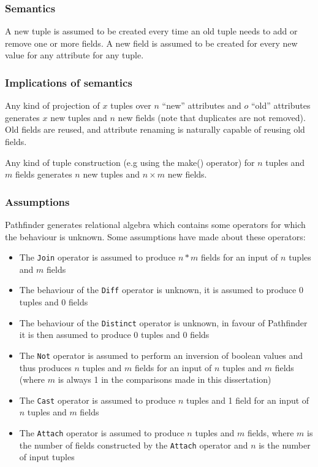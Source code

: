 \subsubsection{Semantics}
A new tuple is assumed to be created every time an old tuple needs to add or
remove one or more fields. A new field is assumed to be created for every new
value for any attribute for any tuple.

\subsubsection{Implications of semantics}
Any kind of projection of $x$ tuples over $n$ ``new'' attributes and $o$
``old'' attributes generates $x$ new tuples and $n$ new fields (note that
duplicates are not removed). Old fields are reused, and attribute renaming
is naturally capable of reusing old fields.

Any kind of tuple construction (e.g using the \textsf{make()} operator)
for $n$ tuples and $m$ fields generates $n$ new tuples and $n \times m$ new
fields.

\subsubsection{Assumptions}
\label{sect:method:complexity:assumptions}
Pathfinder generates relational algebra which contains some operators for which
the behaviour is unknown. Some assumptions have made about these operators:
\begin{itemize}
  \item The \texttt{Join} operator is assumed to produce $n*m$ fields for an
  input of $n$ tuples and $m$ fields
  \item The behaviour of the \texttt{Diff} operator is unknown, it is assumed
  to produce 0 tuples and 0 fields
  \item The behaviour of the \texttt{Distinct} operator is unknown, in favour
  of Pathfinder it is then assumed to produce 0 tuples and 0 fields
  \item The \texttt{Not} operator is assumed to perform an inversion of boolean
  values and thus produces $n$ tuples and $m$ fields for an input of $n$ tuples
  and $m$ fields (where $m$ is always 1 in the comparisons made in this dissertation)
  \item The \texttt{Cast} operator is assumed to produce $n$ tuples and 1
  field for an input of $n$ tuples and $m$ fields
  \item The \texttt{Attach} operator is assumed to produce $n$ tuples and $m$
  fields, where $m$ is the number of fields constructed by the \texttt{Attach}
  operator and $n$ is the number of input tuples
\end{itemize}

